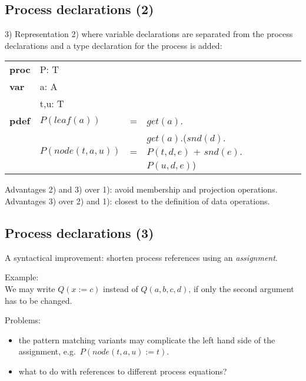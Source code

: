 \documentclass{article}
\makeatletter
\newcommand{\frm}[1]{\mbox{\ensuremath{#1}}}
\newcommand{\f}[1]{\ensuremath{\mathit{#1}}}
\newcommand{\fa}[2]{\ensuremath{\f{#1}(#2)}}
\newcommand{\faaa}[4]{\ensuremath{\f{#1}(#2, #3, #4)}}
\newcommand{\faaaa}[5]{\ensuremath{\f{#1}(#2, #3, #4, #5)}}
\newenvironment{genspect}%
{\par\bigskip\noindent%
 \begin{tabular}{@{}>{\bf}p{2.3em}L@{\ }L@{\ }L@{\ }L@{\ }L@{\ }L@{\ }L@{\ }L}%
}%
{\end{tabular}\bigskip\par%
}
\makeatother
\begin{document}
\begin{slidetop}
\section*{Process declarations (2)}

3) Representation 2) where variable declarations are separated from the process declarations and a type declaration for the process is added:
\begin{genspect}
proc & P: T\\
var  & a: A\\
     & t,u: T\\
pdef & \fa{P}{\fa{leaf}{a}}         & = & \fa{get}{a}.\delta\\
     & \fa{P}{\faaa{node}{t}{a}{u}} & = & 
       \fa{get}{a}.(\fa{snd}{d}.\faaa{P}{t}{d}{e} + \fa{snd}{e}.\faaa{P}{u}{d}{e})    
\end{genspect}

\bigskip
Advantages 2) and 3) over 1): avoid membership and projection operations.\\
Advantages 3) over 2) and 1): closest to the definition of data operations.
\end{slidetop}

\begin{slidetop}
\section*{Process declarations (3)}

A syntactical improvement: shorten process references using an \emph{assignment}.

\bigskip
Example:\\
We may write \frm{\fa{Q}{x := c}} instead of \frm{\faaaa{Q}{a}{b}{c}{d}}, if only the second argument has to be changed.

\bigskip
Problems:
\begin{itemize}
\item the pattern matching variants may complicate the left hand side of the assignment, e.g.\ \frm{\fa{P}{\faaa{node}{t}{a}{u} := t}}.
\item what to do with references to different process equations?
\end{itemize}
\end{slidetop}
\end{document}
